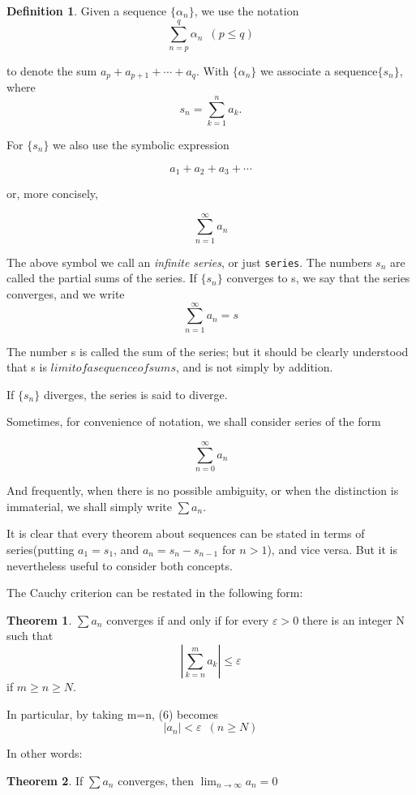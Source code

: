 \documentclass{article}
\theoremstyle{definition}
\newtheorem{defi}{Definition}
\newtheorem{theo}{Theorem}
\theoremstyle{remark}
\begin{document}
\begin{defi}
Given a sequence $\{\alpha_n\}$, we use the notation
\[
\sum^q_{n=p}\alpha_n\enspace (p\le q)
\]

to denote the sum $a_p+a_{p+1}+\cdots+a_q$. With $\{\alpha_n\}$ we associate a sequence$\{s_n\}$, where
\[
s_n=\sum^n_{k=1}a_k.
\]

For $\{s_n\}$ we also use the symbolic expression

\[
a_1+a_2+a_3+\cdots
\]

or, more concisely,

\[
\sum^\infty_{n=1}a_n
\]

The above symbol we call an \textit{infinite series}, or just \texttt{series}. The numbers $s_n$ are called the partial sums of the series. If $\{s_n\}$ converges to s, we say that the series converges, and we write
\[
\sum^\infty_{n=1}a_n=s
\]

The number s is called the sum of the series; but it should be clearly understood that s is $limit of a sequence of sums$, and is not simply by addition.

If $\{s_n\}$ diverges, the series is said to diverge.
	
\end{defi}

Sometimes, for convenience of notation, we shall consider series of the form

\[
\sum^\infty_{n=0}a_n
\]

And frequently, when there is no possible ambiguity, or when the distinction is immaterial, we shall simply write $\sum a_n$.

It is clear that every theorem about sequences can be stated in terms of series(putting $a_1=s_1$, and $a_n=s_n-s_{n-1}$ for $n>1$), and vice versa. But it is nevertheless useful to consider both concepts.

The Cauchy criterion can be restated in the following form:

\begin{theo}
	$\sum a_n$ converges if and only if for every $\varepsilon>0$ there is an integer N such that
	\[
	|\sum_{k=n}^ma_k|\le \varepsilon
	\]
	if $m\ge n\ge N$.
	
	In particular, by taking m=n, (6) becomes
	\[
	|a_n|<\varepsilon\enspace(n\ge N)
	\]
	
\end{theo}

\noindent In other words:

\begin{theo}
	If $\sum a_n$ converges, then $\lim_{n\rightarrow\infty}a_n=0$
\end{theo}
\end{document}
